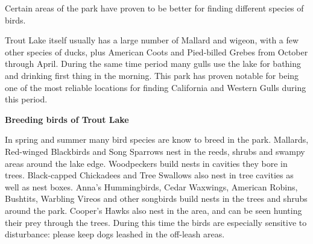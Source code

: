 Certain areas of the park have proven to be better for finding different species of birds. 

Trout Lake itself usually has a large number of Mallard and wigeon, with a few other species of ducks, plus American Coots and Pied-billed Grebes from October through April. During the same time period many gulls use the lake for bathing and drinking first thing in the morning. This park has proven notable for being one of the most reliable locations for finding California and Western Gulls during this period. 

\textbf{Breeding birds of Trout Lake}

In spring and summer many bird species are know to breed in the park. 
Mallards, Red-winged Blackbirds and Song Sparrows nest in the reeds, shrubs 
and swampy areas around the lake edge. Woodpeckers build nests in cavities they 
bore in trees. Black-capped Chickadees and Tree Swallows also nest in tree cavities 
as well as nest boxes.
Anna's Hummingbirds, Cedar Waxwings, American Robins, Bushtits, Warbling Vireos and 
other songbirds build nests in the trees and shrubs around the park. 
Cooper's Hawks also nest in the 
area, and can be seen hunting their prey through the trees. During this time the 
birds are especially sensitive to disturbance: please keep dogs leashed in the off-leash areas.


